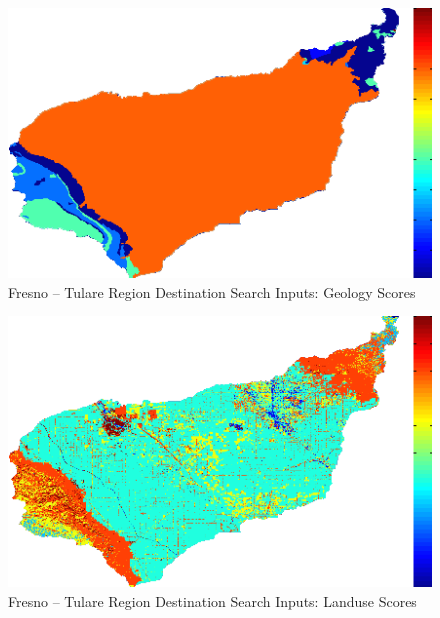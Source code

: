         \begin{figure}[!h]
            \begin{center}
            \includegraphics[width=5.5in]{figures/Fresno_Search_Geology.png}   
            \caption{Fresno -- Tulare Region Destination Search Inputs: Geology Scores}
            \label{fig:Fdsinputs_geology}
            \end{center}
        \end{figure}
    
        \begin{figure}[!h]
            \begin{center}
            \includegraphics[width=5.5in]{figures/Fresno_Search_Landuse.png}   
            \caption{Fresno -- Tulare Region Destination Search Inputs: Landuse Scores}
            \label{fig:Fdsinputs_landuse}
            \end{center}
        \end{figure}
    
